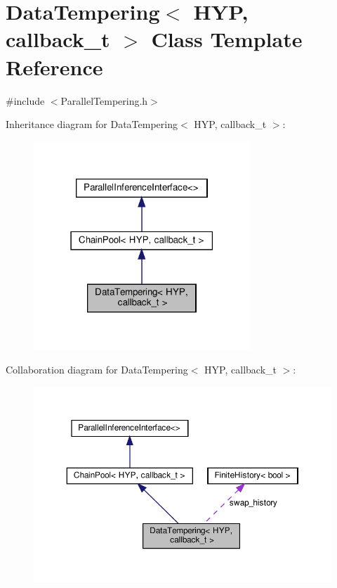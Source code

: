 \hypertarget{class_data_tempering}{}\section{Data\+Tempering$<$ H\+YP, callback\+\_\+t $>$ Class Template Reference}
\label{class_data_tempering}


{\ttfamily \#include $<$Parallel\+Tempering.\+h$>$}



Inheritance diagram for Data\+Tempering$<$ H\+YP, callback\+\_\+t $>$\+:
\nopagebreak
\begin{figure}[H]
\begin{center}
\leavevmode
\includegraphics[width=231pt]{class_data_tempering__inherit__graph}
\end{center}
\end{figure}


Collaboration diagram for Data\+Tempering$<$ H\+YP, callback\+\_\+t $>$\+:
\nopagebreak
\begin{figure}[H]
\begin{center}
\leavevmode
\includegraphics[width=350pt]{class_data_tempering__coll__graph}
\end{center}
\end{figure}
